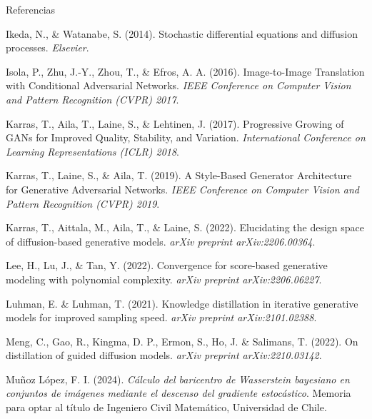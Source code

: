 \documentclass[aspectratio=169,xcolor=dvipsnames, t, spanish]{beamer}
\begin{document}
\begin{frame}{Referencias}
{\begin{thebibliography}{99}
             Ikeda, N., \& Watanabe, S. (2014).
            \newblock Stochastic differential equations and diffusion processes.
            \newblock \emph{Elsevier}.
            
             Isola, P., Zhu, J.-Y., Zhou, T., \& Efros, A. A. (2016).
            \newblock Image-to-Image Translation with Conditional Adversarial Networks.
            \newblock \emph{IEEE Conference on Computer Vision and Pattern Recognition (CVPR) 2017}.

             Karras, T., Aila, T., Laine, S., \& Lehtinen, J. (2017).
            \newblock Progressive Growing of GANs for Improved Quality, Stability, and Variation.
            \newblock \emph{International Conference on Learning Representations (ICLR) 2018}.

             Karras, T., Laine, S., \& Aila, T. (2019).
            \newblock A Style-Based Generator Architecture for Generative Adversarial Networks.
            \newblock \emph{IEEE Conference on Computer Vision and Pattern Recognition (CVPR) 2019}.

             Karras, T., Aittala, M., Aila, T., \& Laine, S. (2022).
            \newblock Elucidating the design space of diffusion-based generative models.
            \newblock \emph{arXiv preprint arXiv:2206.00364}.

             Lee, H., Lu, J., \& Tan, Y. (2022).
            \newblock Convergence for score-based generative modeling with polynomial complexity.
            \newblock \emph{arXiv preprint arXiv:2206.06227}.

             Luhman, E. \& Luhman, T. (2021).
            \newblock Knowledge distillation in iterative generative models for improved sampling speed.
            \newblock \emph{arXiv preprint arXiv:2101.02388}.
            
             Meng, C., Gao, R., Kingma, D. P., Ermon, S., Ho, J. \& Salimans, T. (2022).
            \newblock On distillation of guided diffusion models.
            \newblock \emph{arXiv preprint arXiv:2210.03142}.

             Muñoz López, F. I. (2024).
            \newblock \emph{Cálculo del baricentro de Wasserstein bayesiano en conjuntos de imágenes mediante el descenso del gradiente estocástico}.
            \newblock Memoria para optar al título de Ingeniero Civil Matemático, Universidad de Chile.


\end{thebibliography}}
\end{frame}
\end{document}

